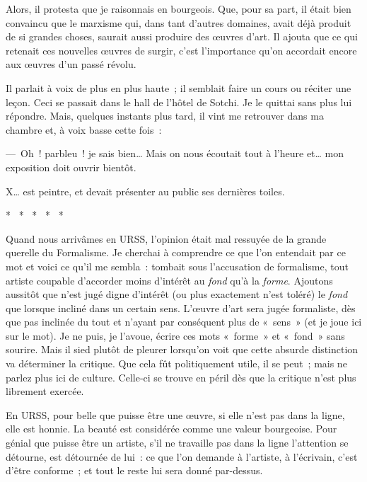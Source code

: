 \documentclass[french,twoside]{book} %
\begin{document}
Alors, il protesta que je raisonnais en bourgeois. Que, pour sa part, il était bien convaincu que le marxisme qui, dans tant d’autres domaines, avait déjà produit de si grandes choses, saurait aussi produire des œuvres d’art. Il ajouta que ce qui retenait ces nouvelles œuvres de surgir, c’est l’importance qu’on accordait encore aux œuvres d’un passé révolu.\par
Il parlait à voix de plus en plus haute ; il semblait faire un cours ou réciter une leçon. Ceci se passait dans le hall de l’hôtel de Sotchi. Je le quittai sans plus lui répondre. Mais, quelques instants plus tard, il vint me retrouver dans ma chambre et, à voix basse cette fois :\par
— Oh ! parbleu ! je sais bien… Mais on nous écoutait tout à l’heure et… mon exposition doit ouvrir bientôt.\par
X… est peintre, et devait présenter au public ses dernières toiles.\par

\begin{center}
\noindent \centerline{*  *  *  *  *}\par
\end{center}

\noindent Quand nous arrivâmes en URSS, l’opinion était mal ressuyée de la grande querelle du Formalisme. Je cherchai à comprendre ce que l’on entendait par ce mot et voici ce qu’il me sembla : tombait sous l’accusation de formalisme, tout artiste coupable d’accorder moins d’intérêt au \emph{fond} qu’à la \emph{forme}. Ajoutons aussitôt que n’est jugé digne d’intérêt (ou plus exactement n’est toléré) le \emph{fond} que lorsque incliné dans un certain sens. L’œuvre d’art sera jugée formaliste, dès que pas inclinée du tout et n’ayant par conséquent plus de « sens » (et je joue ici sur le mot). Je ne puis, je l’avoue, écrire ces mots « forme » et « fond » sans sourire. Mais il sied plutôt de pleurer lorsqu’on voit que cette absurde distinction va déterminer la critique. Que cela fût politiquement utile, il se peut ; mais ne parlez plus ici de culture. Celle-ci se trouve en péril dès que la critique n’est plus librement exercée.\par
En URSS, pour belle que puisse être une œuvre, si elle n’est pas dans la ligne, elle est honnie. La beauté est considérée comme une valeur bourgeoise. Pour génial que puisse être un artiste, s’il ne travaille pas dans la ligne l’attention se détourne, est détournée de lui : ce que l’on demande à l’artiste, à l’écrivain, c’est d’être conforme ; et tout le reste lui sera donné par-dessus.\par
\end{document}
